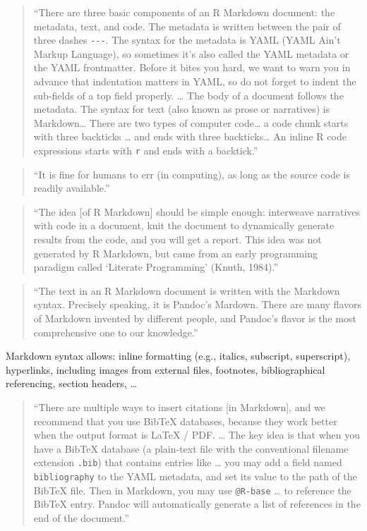 \documentclass[]{tufte-book}
\begin{document}
\begin{quote}
``There are three basic components of an R Markdown document: the
metadata, text, and code. The metadata is written between the pair of
three dashes \texttt{-\/-\/-}. The syntax for the metadata is YAML (YAML Ain't Markup
Language), so sometimes it's also called the YAML metadata or the YAML
frontmatter. Before it bites you hard, we want to warn you in advance
that indentation matters in YAML, so do not forget to indent the sub-fields
of a top field properly. \ldots{} The body of a document follows the metadata.
The syntax for text (also known as prose or narratives) is Markdown\ldots{}
There are two types of computer code\ldots{} a code chunk starts with three
backticks \ldots{} and ends with three backticks\ldots{} An inline R code expressions
starts with \texttt{\textasciigrave{}r} and ends with a backtick.'' \citep{xie2018r}
\end{quote}

\begin{quote}
``It is fine for humans to err (in computing), as long as the source code
is readily available.'' \citep{xie2018r}
\end{quote}

\begin{quote}
``The idea {[}of R Markdown{]} should be simple enough: interweave narratives
with code in a document, knit the document to dynamically generate results
from the code, and you will get a report. This idea was not generated by
R Markdown, but came from an early programming paradigm called `Literate
Programming' (Knuth, 1984).'' \citep{xie2018r}
\end{quote}

\begin{quote}
``The text in an R Markdown document is written with the Markdown syntax.
Precisely speaking, it is Pandoc's Mardown. There are many flavors of
Markdown invented by different people, and Pandoc's flavor is the
most comprehensive one to our knowledge.'' \citep{xie2018r}
\end{quote}

Markdown syntax allows: inline formatting (e.g., italics, subscript,
superscript), hyperlinks, including images from external files, footnotes,
bibliographical referencing, section headers, \ldots{} \citep{xie2018r}

\begin{quote}
``There are multiple ways to insert citations {[}in Markdown{]}, and we
recommend that you use BibTeX databases, because they work better when
the output format is LaTeX / PDF. \ldots{} The key idea is that when you have
a BibTeX database (a plain-text file with the conventional filename extension
\texttt{.bib}) that contains entries like \ldots{} you may add a field named
\texttt{bibliography} to the YAML metadata, and set its value to the path of the
BibTeX file. Then in Markdown, you may use \texttt{@R-base} \ldots{} to reference the
BibTeX entry. Pandoc will automatically generate a list of references in the
end of the document.'' \citep{xie2018r}
\end{quote}
\end{document}
